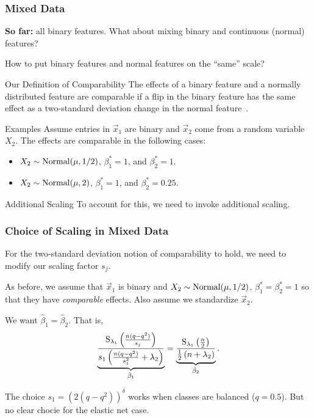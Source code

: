 \documentclass[10pt]{beamer}
\begin{document}
\begin{frame}[c]
  \frametitle{Mixed Data}

  \textbf{So far:} \alert{all} binary features. What about mixing binary and continuous (normal) features?

  \medskip

  How to put binary features and normal features on the ``same'' scale?

  \medskip\pause

  \begin{block}{Our Definition of Comparability}
    The effects of a binary feature and a normally distributed feature are \alert{comparable} if a flip in the binary feature has the same effect as a two-standard deviation change in the normal feature~\parencite{gelman2008}.
  \end{block}

  \pause

  \begin{exampleblock}{Examples}
    Assume entries in \(\vec{x}_1\) are binary and \(\vec{x}_2\) come from a random variable \(X_2\). The effects are comparable in the following cases:
    \begin{itemize}
      \item \(X_2 \sim \operatorname{Normal}(\mu, 1/2)\), \(\beta_1^* = 1\), and \(\beta_2^* = 1\).
      \item \(X_2 \sim \operatorname{Normal}(\mu, 2)\), \(\beta_1^* = 1\), and \(\beta_2^* = 0.25\).
    \end{itemize}
  \end{exampleblock}

  \pause

  \begin{block}{Additional Scaling}
    To account for this, we need to invoke additional scaling.

  \end{block}
\end{frame}

\begin{frame}[c]
  \frametitle{Choice of Scaling in Mixed Data}

  For the two-standard deviation notion of comparability to hold, we need to modify our scaling factor \(s_j\).

  \bigskip\pause

  As before, we assume that \(\vec{x}_1\) is binary and
  \(X_2 \sim \operatorname{Normal}(\mu, 1/2)\), \(\beta_1^* = \beta_2^* = 1\) so that they have \emph{comparable} effects. Also assume we standardize \(\vec{x}_2\).

  \medskip

  We want \(\hat{\beta}_1 = \hat{\beta}_2\). That is,
  \[
    \underbrace{\frac{\operatorname{S}_{\lambda_1}\left(\frac{n (q - q^2)}{s_j}\right)}{s_1\left(\frac{n(q - q^2)}{s_1^2} + \lambda_2\right)}}_{\hat{\beta}_1}  = \underbrace{\frac{\operatorname{S}_{\lambda_1}\left(\frac{n}{2}\right)}{\frac{1}{2}\left(n + \lambda_2\right)}}_{\hat{\beta}_2}.
  \]

  \medskip\pause

  The choice \(s_1 = (2 (q - q^2))^\delta\) works when classes are balanced (\(q = 0.5\)). But no clear chocie for the elastic net case.
\end{frame}
\end{document}
